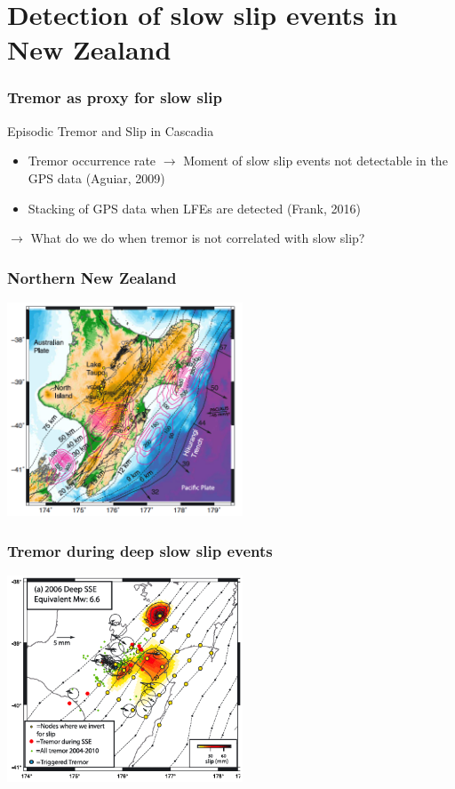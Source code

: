 \documentclass{beamer}
\begin{document}
	\section{Detection of slow slip events in New Zealand}

	\begin{frame}
		\frametitle{Tremor as proxy for slow slip}
		Episodic Tremor and Slip in Cascadia
		\begin{itemize}
			\item Tremor occurrence rate $\rightarrow$ Moment of slow slip events not detectable in the GPS data (Aguiar, 2009)
			\item Stacking of GPS data when LFEs are detected (Frank, 2016)
		\end{itemize}
		$\rightarrow$ What do we do when tremor is not correlated with slow slip?
	\end{frame}
		
	\begin{frame}
		\frametitle{Northern New Zealand}
		\begin{center}
			\includegraphics[trim={0cm 0cm 0cm 0cm}, clip, width=7cm]{articles/wallace_eberhart-phillips_2013_1.png}
		\end{center}
	\end{frame}

	\begin{frame}
		\frametitle{Tremor during deep slow slip events}
		\begin{center}
			\includegraphics[trim={0cm 0cm 0cm 0cm}, clip, width=7cm]{articles/wallace_eberhart-phillips_2013_3a.png}
		\end{center}
	\end{frame}
\end{document}

